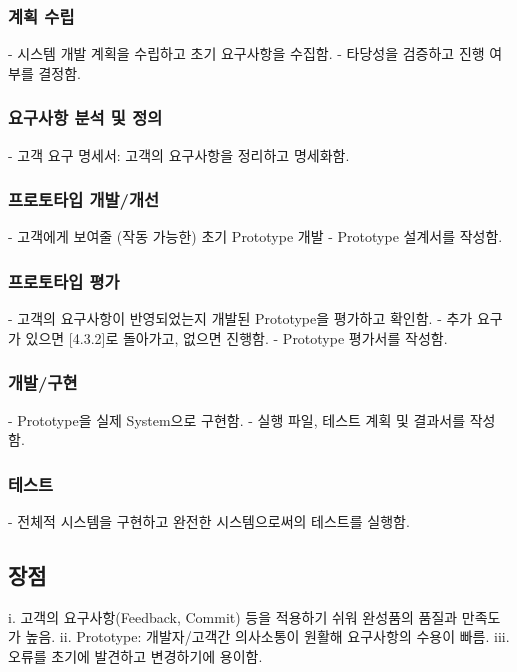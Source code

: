 \documentclass[a4paper,12pt]{article}
\begin{document}
\subsubsection{계획 수립}
- 시스템 개발 계획을 수립하고 초기 요구사항을 수집함.
\newline
- 타당성을 검증하고 진행 여부를 결정함.

\subsubsection{요구사항 분석 및 정의}
- 고객 요구 명세서: 고객의 요구사항을 정리하고 명세화함.

\subsubsection{프로토타입 개발/개선}
- 고객에게 보여줄 (작동 가능한) 초기 Prototype 개발
\newline
- Prototype 설계서를 작성함.

\subsubsection{프로토타입 평가}
- 고객의 요구사항이 반영되었는지 개발된 Prototype을 평가하고 확인함.
\newline
- 추가 요구가 있으면 [4.3.2]로 돌아가고, 없으면 진행함.
\newline
- Prototype 평가서를 작성함.

\subsubsection{개발/구현}
- Prototype을 실제 System으로 구현함.
\newline
- 실행 파일, 테스트 계획 및 결과서를 작성함.

\subsubsection{테스트}
- 전체적 시스템을 구현하고 완전한 시스템으로써의 테스트를 실행함.
\newline

\subsection{장점}
i. 고객의 요구사항(Feedback, Commit) 등을 적용하기 쉬워 완성품의 품질과 만족도가 높음.
\newline
ii. Prototype: 개발자/고객간 의사소통이 원활해 요구사항의 수용이 빠름.
\newline
iii. 오류를 초기에 발견하고 변경하기에 용이함.
\newline
\end{document}
